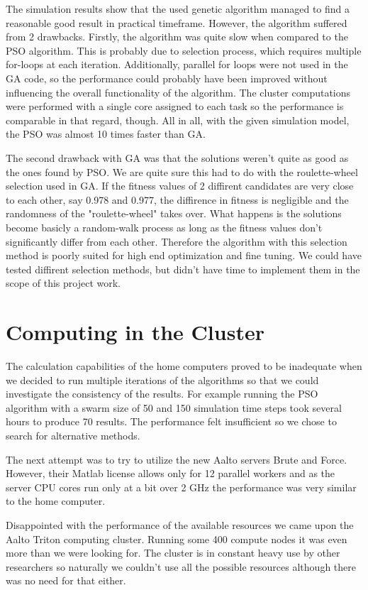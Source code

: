 \documentclass[twoside]{article}
\begin{document}
\begin{multicols}{2}
	The simulation results show that the used genetic algorithm managed to find a reasonable good result in practical timeframe. However, the algorithm suffered from 2 drawbacks. Firstly, the algorithm was quite slow when compared to the PSO algorithm. This is probably due to selection process, which requires multiple for-loops at each iteration. Additionally, parallel for loops were not used in the GA code, so the performance could probably have been improved without influencing the overall functionality of the algorithm. The cluster computations were performed with a single core assigned to each task so the performance is comparable in that regard, though. All in all, with the given simulation model, the PSO was almost 10 times faster than GA.
	
	The second drawback with GA was that the solutions weren't quite as good as the ones found by PSO. We are quite sure this had to do with the roulette-wheel selection used in GA. If the fitness values of 2 diffirent candidates are very close to each other, say 0.978 and 0.977, the diffirence in fitness is negligible and the randomness of the "roulette-wheel" takes over. What happens is the solutions become basicly a random-walk process as long as the fitness values don't significantly differ from each other. Therefore the algorithm with this selection method is poorly suited for high end optimization and fine tuning. We could have tested diffirent selection methods, but didn't have time to implement them in the scope of this project work.
	
	
	\section{Computing in the Cluster}
	The calculation capabilities of the home computers proved to be inadequate when we decided to run multiple iterations of the algorithms so that we could investigate the consistency of the results. For example running the PSO algorithm with a swarm size of 50 and 150 simulation time steps took several hours to produce 70 results. The performance felt insufficient so we chose to search for alternative methods.
	
	The next attempt was to try to utilize the new Aalto servers Brute and Force. However, their Matlab license allows only for 12 parallel workers and as the server CPU cores run only at a bit over 2 GHz the performance was very similar to the home computer.
	
	Disappointed with the performance of the available resources we came upon the Aalto Triton computing cluster. Running some 400 compute nodes it was even more than we were looking for. The cluster is in constant heavy use by other researchers so naturally we couldn't use all the possible resources although there was no need for that either.
	

\end{multicols}
\end{document}
